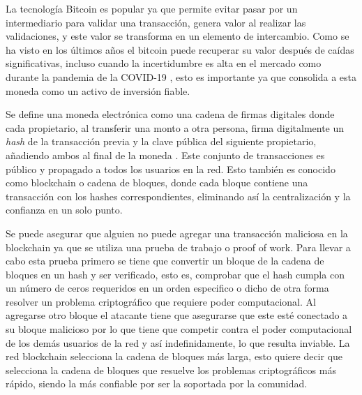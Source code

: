 La tecnología Bitcoin es popular ya que permite evitar pasar por un intermediario para validar una transacción, genera valor al realizar las validaciones, y este valor se transforma en un elemento de intercambio. Como se ha visto en los últimos años el bitcoin puede recuperar su valor después de caídas significativas, incluso cuando la incertidumbre es alta en el mercado como durante la pandemia de la COVID-19 \cite{mudassirTimeseriesForecastingBitcoin2020}, esto es importante ya que consolida a esta moneda como un activo de inversión fiable.


Se define una moneda electrónica como una cadena de firmas digitales donde cada propietario, al transferir una monto a otra persona, firma digitalmente un \textit{hash} de la transacción previa y la clave pública del siguiente propietario, añadiendo ambos al final de la moneda \cite{nakamotoBitcoinPeertoPeerElectronic}. Este conjunto de transacciones es público y propagado a todos los usuarios en la red. Esto también es conocido como blockchain o cadena de bloques, donde cada bloque contiene una transacción con los hashes correspondientes, eliminando así la centralización y la confianza en un solo punto.


Se puede asegurar que alguien no puede agregar una transacción maliciosa en la blockchain ya que se utiliza una prueba de trabajo o proof of work. Para llevar a cabo esta prueba primero se tiene que convertir un bloque de la cadena de bloques en un hash y ser verificado, esto es, comprobar que el hash cumpla con un número de ceros requeridos en un orden especifico o dicho de otra forma resolver un problema criptográfico que requiere poder computacional. Al agregarse otro bloque el atacante tiene que asegurarse que este esté conectado a su bloque malicioso por lo que tiene que competir contra el poder computacional de los demás usuarios de la red y así indefinidamente, lo que resulta inviable. La red blockchain selecciona la cadena de bloques más larga, esto quiere decir que selecciona la cadena de bloques que resuelve los problemas criptográficos más rápido, siendo la más confiable por ser la soportada por la comunidad.

